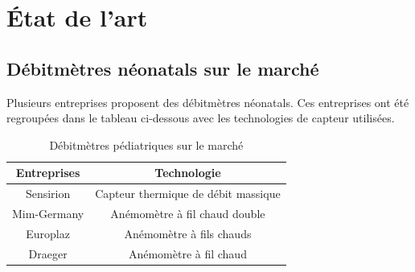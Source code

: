 \section{État de l'art}
\subsection{Débitmètres néonatals sur le marché}

Plusieurs entreprises proposent des débitmètres néonatals. Ces entreprises ont été regroupées dans le tableau ci-dessous avec les 
technologies de capteur utilisées. \\

\begin{table}[H]
    \centering
    \begin{tabular}{|c|c|}
        \hline
        \textbf{Entreprises} & \textbf{Technologie}                \\
        \hline
        Sensirion            & Capteur thermique de débit massique \\
        \hline
        Mim-Germany          & Anémomètre à fil chaud double       \\
        \hline
        Europlaz             & Anémomètre à fils chauds            \\
        \hline
        Draeger              & Anémomètre à fil chaud              \\
        \hline
    \end{tabular}
    \caption{Débitmètres pédiatriques sur le marché}
    \label{tab:debitmetreMarche}
\end{table}


